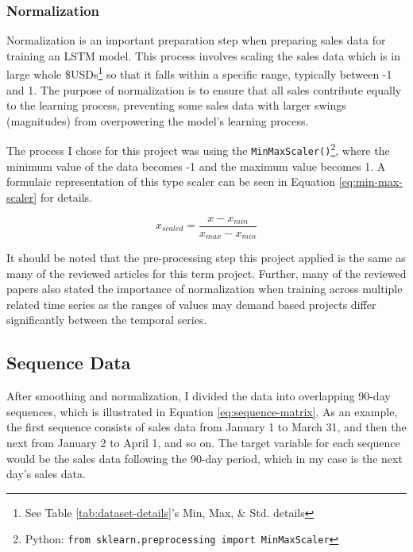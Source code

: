 \documentclass[10pt, journal, letterpaper, compsoc]{IEEEtran}
\begin{document}
\subsubsection{Normalization}
Normalization is an important preparation step when preparing sales data for training an LSTM model\cite{improved-sales-forecasting}. This process involves scaling the sales data which is in large whole \$USDs\footnote{See Table \ref{tab:dataset-details}'s Min, Max, \& Std. details} so that it falls within a specific range, typically between -1 and 1. The purpose of normalization is to ensure that all sales contribute equally to the learning process, preventing some sales data with larger swings (magnitudes) from overpowering\cite{improved-sales-forecasting} the model's learning process.

The process I chose for this project was using the \texttt{MinMaxScaler()}\footnote{Python: \texttt{from sklearn.preprocessing import MinMaxScaler}}, where the minimum value of the data becomes \textsc{-1} and the maximum value becomes \textsc{1}. A formulaic representation of this type scaler can be seen in Equation \ref{eq:min-max-scaler} for details.

\begin{equation}
x_{scaled} = \frac{x-x_{min}}{x_{max}-x_{min}}
\label{eq:min-max-scaler}
\end{equation}

It should be noted that the pre-processing step this project applied is the same as many of the reviewed articles\cite{demand-forecasting-lstm, improved-sales-forecasting} for this term project. Further, many of the reviewed papers\cite{demand-forecasting-lstm} also stated the importance of normalization when training across multiple related time series as the ranges of values may demand based projects differ significantly between the temporal series.

\subsection{Sequence Data}
After smoothing and normalization, I divided the data into overlapping 90-day sequences, which is illustrated in Equation \ref{eq:sequence-matrix}. As an example, the first sequence consists of sales data from January 1 to March 31, and then the next from January 2 to April 1, and so on. The target variable for each sequence would be the sales data following the 90-day period, which in my case is the next day's sales data.
\end{document}
